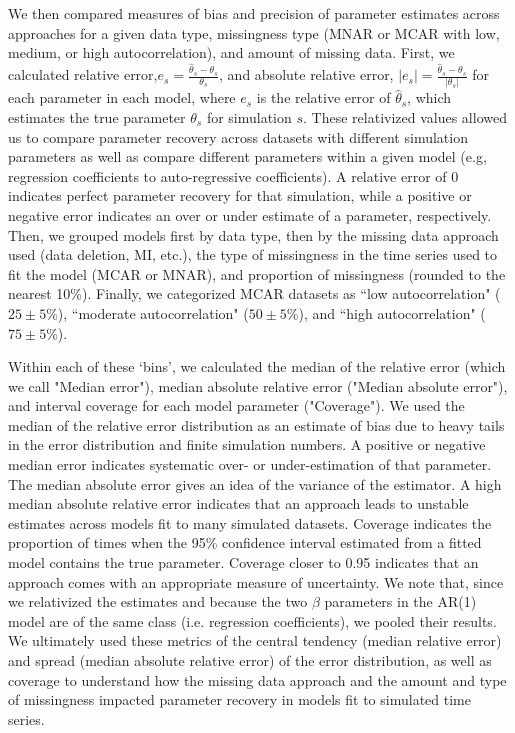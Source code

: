 \documentclass{article}
\begin{document}
We then compared measures of bias and precision of parameter estimates across approaches for a given data type, missingness type (MNAR or MCAR with low, medium, or high autocorrelation), and amount of missing data. First, we calculated relative error,$e_s = \frac{\hat{\theta}_s - \theta_s}{\theta_s}$, and absolute relative error, $|e_s| = \frac{\hat{\theta}_s - \theta_s}{|\theta_s|}$ for each parameter in each model, where $e_s$ is the relative error of $\hat \theta_s$, which estimates the true parameter $\theta_s$ for simulation $s$. These relativized values allowed us to compare parameter recovery across datasets with different simulation parameters as well as compare different parameters within a given model (e.g, regression coefficients to auto-regressive coefficients). A relative error of 0 indicates perfect parameter recovery for that simulation, while a positive or negative error indicates an over or under estimate of a parameter, respectively. Then, we grouped models first by data type, then by the missing data approach used (data deletion, MI, etc.), the type of missingness in the time series used to fit the model (MCAR or MNAR), and proportion of missingness (rounded to the nearest 10\%). Finally, we categorized MCAR datasets as ``low autocorrelation" ($25 \pm 5\%$), ``moderate autocorrelation" ($50 \pm 5\%$), and ``high autocorrelation" ($75 \pm 5\%$).

Within each of these `bins', we calculated the median of the relative error (which we call "Median error"), median absolute relative error ("Median absolute error"), and interval coverage for each model parameter ("Coverage"). We used the median of the relative error distribution as an estimate of bias due to heavy tails in the error distribution and finite simulation numbers. A positive or negative median error indicates systematic over- or under-estimation of that parameter. The median absolute error gives an idea of the variance of the estimator. A high median absolute relative error indicates that an approach leads to unstable estimates across models fit to many simulated datasets. Coverage indicates the proportion of times when the 95\% confidence interval estimated from a fitted model contains the true parameter. Coverage closer to 0.95 indicates that an approach comes with an appropriate measure of uncertainty. We note that, since we relativized the estimates and because the two $\beta$ parameters in the AR(1) model are of the same class (i.e. regression coefficients), we pooled their results. We ultimately used these metrics of the central tendency (median relative error) and spread (median absolute relative error) of the error distribution, as well as coverage to understand how the missing data approach and the amount and type of missingness impacted parameter recovery in models fit to simulated time series.
\end{document}
